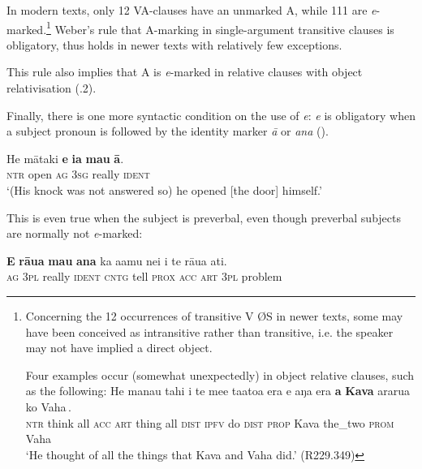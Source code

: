 In modern texts, only 12 VA-clauses have an unmarked A, while 111 are \textit{e}{}-marked.\footnote{\label{fn:392}Concerning the 12 occurrences of transitive V ØS in newer texts, some may have been conceived as intransitive rather than transitive, i.e. the speaker may not have implied a direct object. 

Four examples occur (somewhat unexpectedly) in object relative clauses, such as the following:
\ea
\gll
He mana{\ꞌ}u tahi i te me{\ꞌ}e ta{\ꞌ}ato{\ꞌ}a era {\ob}e aŋa era \textbf{a} \textbf{Kava} ararua ko Vaha\,{\cb}.\\
  \textsc{ntr} think all \textsc{acc} \textsc{art} thing all \textsc{dist} {\db}\textsc{ipfv} do \textsc{dist} \textsc{prop} Kava the\_two \textsc{prom} Vaha\\
  \glt 
  ‘He thought of all the things that Kava and Vaha did.’ (R229.349)
  \z} Weber’s rule that A-marking in single-argument transitive clauses is obligatory, thus holds in newer texts with relatively few exceptions.

This rule also implies that A is \textit{e}{}-marked in relative clauses with object relativisation (.2).

Finally, there is one more syntactic condition on the use of \textit{e}: \textit{e} is obligatory when a subject pronoun is followed by the identity marker \textit{{\ꞌ}ā} or \textit{{\ꞌ}ana} (). 

\ea\label{ex:8.13}
\gll He mātaki \textbf{e} \textbf{ia} \textbf{mau} \textbf{{\ꞌ}ā}. \\
\textsc{ntr} open \textsc{ag} \textsc{3sg} really \textsc{ident} \\

\glt
‘(His knock was not answered so) he opened [the door] himself.’ \textstyleExampleref{[R399.189]} 
\z

This is even true when the subject is preverbal, even though preverbal subjects are normally not \textit{e}{}-marked:

\ea\label{ex:8.14}
\gll \textbf{E} \textbf{rāua} \textbf{mau} \textbf{{\ꞌ}ana} ka {\ꞌ}a{\ꞌ}amu nei i te rāua {\ꞌ}ati. \\
\textsc{ag} \textsc{3pl} really \textsc{ident} \textsc{cntg} tell \textsc{prox} \textsc{acc} \textsc{art} \textsc{3pl} problem \\

